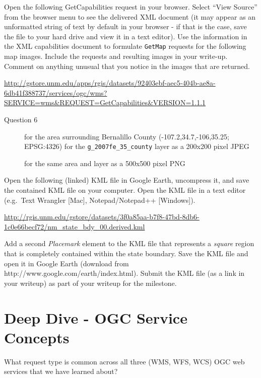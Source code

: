 \documentclass[]{book}
\providecommand{\tightlist}{%
  \setlength{\itemsep}{0pt}\setlength{\parskip}{0pt}}
\begin{document}
Open the following GetCapabilities request in your browser. Select
``View Source'' from the browser menu to see the delivered XML document
(it may appear as an unformatted string of text by default in your
browser - if that is the case, save the file to your hard drive and view
it in a text editor). Use the information in the XML capabilities
document to formulate \texttt{GetMap} requests for the following map
images. Include the requests and resulting images in your write-up.
Comment on anything unusual that you notice in the images that are
returned.

\url{http://gstore.unm.edu/apps/rgis/datasets/92403ebf-aec5-404b-ae8a-6db41f388737/services/ogc/wms?SERVICE=wms\&REQUEST=GetCapabilities\&VERSION=1.1.1}

\begin{description}
\item[Question 6]
for the area surrounding Bernalillo County (-107.2,34.7,-106,35.25;
EPSG:4326) for the \texttt{g\_2007fe\_35\_county} layer as a 200x200
pixel JPEG

for the same area and layer as a 500x500 pixel PNG
\end{description}

Open the following (linked) KML file in Google Earth, uncompress it, and
save the contained KML file on your computer. Open the KML file in a
text editor (e.g.~Text Wrangler {[}Mac{]}, Notepad/Notepad++
{[}Windows{]}).

\url{http://rgis.unm.edu/gstore/datasets/3f0a85aa-b7f8-47bd-8db6-1c0e66becf72/nm_state_bdy_00.derived.kml}

\begin{description}
\tightlist
\item[Question 7]
Add a second \emph{Placemark} element to the KML file that represents a
\emph{square} region that is completely contained within the state
boundary. Save the KML file and open it in Google Earth (download from
http://www.google.com/earth/index.html). Submit the KML file (as a link
in your writeup) as part of your writeup for the milestone.
\end{description}

\section{Deep Dive - OGC Service Concepts}\label{week06-deepDive}

\begin{description}
\tightlist
\item[Question 1]
What request type is common across all three (WMS, WFS, WCS) OGC web
services that we have learned about?
\end{description}
\end{document}
